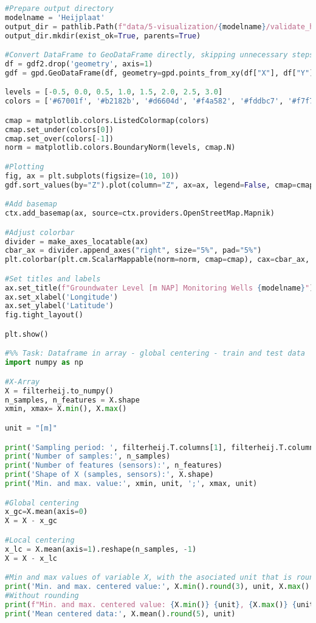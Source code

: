 \begin{lstlisting}[language=Python]
#Prepare output directory
modelname = 'Heijplaat'
output_dir = pathlib.Path(f"data/5-visualization/{modelname}/validate_heads")
output_dir.mkdir(exist_ok=True, parents=True)

#Convert DataFrame to GeoDataFrame directly, skipping unnecessary steps
df = gdf2.drop('geometry', axis=1)
gdf = gpd.GeoDataFrame(df, geometry=gpd.points_from_xy(df["X"], df["Y"]), crs="EPSG:28992").to_crs("EPSG:3857")

levels = [-0.5, 0.0, 0.5, 1.0, 1.5, 2.0, 2.5, 3.0]
colors = ['#67001f', '#b2182b', '#d6604d', '#f4a582', '#fddbc7', '#f7f7f7', '#d1e5f0', '#92c5de']

cmap = matplotlib.colors.ListedColormap(colors)
cmap.set_under(colors[0])
cmap.set_over(colors[-1])
norm = matplotlib.colors.BoundaryNorm(levels, cmap.N)

#Plotting
fig, ax = plt.subplots(figsize=(10, 10))
gdf.sort_values(by="Z").plot(column="Z", ax=ax, legend=False, cmap=cmap, norm=norm, markersize=50, edgecolor='black', linewidth=1.0)

#Add basemap
ctx.add_basemap(ax, source=ctx.providers.OpenStreetMap.Mapnik)

#Adjust colorbar
divider = make_axes_locatable(ax)
cbar_ax = divider.append_axes("right", size="5%", pad="5%")
plt.colorbar(plt.cm.ScalarMappable(norm=norm, cmap=cmap), cax=cbar_ax, ticks=levels, extend="both", label="[m]")

#Set titles and labels
ax.set_title(f"Groundwater Level [m NAP] Monitoring Wells {modelname}")
ax.set_xlabel('Longitude')
ax.set_ylabel('Latitude')
fig.tight_layout()

plt.show()

#%% Task: Dataframe in array - global centering - train and test data 
import numpy as np

#X-Array
X = filterheij.to_numpy()
n_samples, n_features = X.shape
xmin, xmax= X.min(), X.max()

unit = "[m]"

print('Sampling period: ', filterheij.T.columns[1], filterheij.T.columns[-1])
print('Number of samples:', n_samples)
print('Number of features (sensors):', n_features)
print('Shape of X (samples, sensors):', X.shape)
print('Min. and max. value:', xmin, unit, ';', xmax, unit)

#Global centering
x_gc=X.mean(axis=0)
X = X - x_gc

#Local centering 
x_lc = X.mean(axis=1).reshape(n_samples, -1)
X = X - x_lc

#Min and max values of variable X, with the asociated unit that is rounded to 3 decimals.
print('Min. and max. centered value:', X.min().round(3), unit, X.max().round(3), unit)
#Without rounding 
print(f"Min. and max. centered value: {X.min()} {unit}, {X.max()} {unit}")
print('Mean centered data:', X.mean().round(5), unit)


\end{lstlisting}
